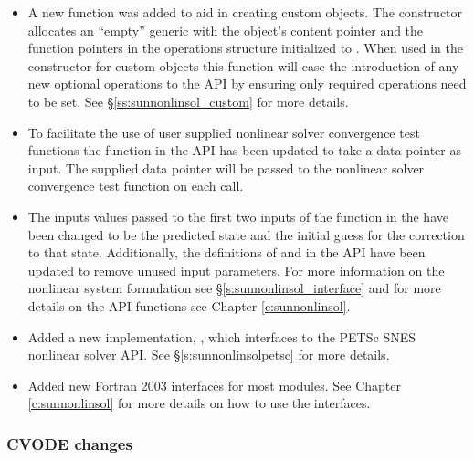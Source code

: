 \begin{itemize}
\item A new function was added to aid in creating custom {\sunnonlinsol}
objects. The constructor  allocates an ``empty''
generic {\sunnonlinsol} with the object's content pointer and the function
pointers in the operations structure initialized to . When used in the
constructor for custom objects this function will ease the introduction of any
new optional operations to the {\sunnonlinsol} API by ensuring only
required operations need to be set. See \S\ref{ss:sunnonlinsol_custom} for more
details.
%
\item To facilitate the use of user supplied nonlinear solver convergence test
functions the \newline\noindent
{} function in the
{\sunnonlinsol} API has been updated to take a  data pointer as
input. The supplied data pointer will be passed to the nonlinear solver
convergence test function on each call.
%
\item The inputs values passed to the first two inputs of the 
function in the {\sunnonlinsol} have been changed to be the predicted
state and the initial guess for the correction to that state. Additionally,
the definitions of  and  in
the {\sunnonlinsol} API have been updated to remove unused input
parameters. For more information on the nonlinear system formulation see
\S\ref{s:sunnonlinsol_interface} and for more details on the API functions see
Chapter \ref{c:sunnonlinsol}.
%
\item Added a new {\sunnonlinsol} implementation, {\sunnonlinsolpetsc}, which
interfaces to the PETSc SNES nonlinear solver API. See
\S\ref{s:sunnonlinsolpetsc} for more details.
%
\item Added new Fortran 2003 interfaces for most {\sunnonlinsol} modules. See
Chapter \ref{c:sunnonlinsol} for more details on how to use the interfaces.
\end{itemize}

\subsubsection*{CVODE changes}

